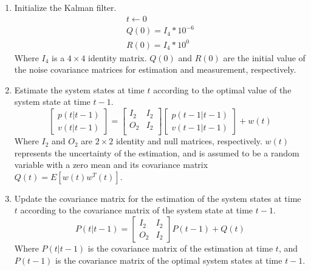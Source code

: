 \begin{enumerate}
	\item Initialize the Kalman filter.
	\begin{eqnarray*}
		t \leftarrow 0 \\
		Q(0) = I_4 * 10^{-6} \\
		R(0) = I_4 * 10^{0}
	\end{eqnarray*}
	Where \(I_4\) is a \(4 \times 4\) identity matrix. \(Q(0)\) and \(R(0)\) are the initial value of the noise covariance matrices for estimation and measurement, respectively. 
	\item Estimate the system states at time \(t\) according to the optimal value of the system state at time \(t-1\).
	\begin{equation}
		\left[
		\begin{matrix}
		p(t|t-1) \\
		v(t|t-1)
		\end{matrix}
		\right] =
		\begin{bmatrix}
		I_2&I_2\\
		O_2&I_2 \\
		\end{bmatrix}
		\begin{bmatrix}
		p(t-1|t-1) \\
		v(t-1|t-1)
		\end{bmatrix}
		+ w(t)
	\end{equation} 
	Where \(I_2\) and \(O_2\) are \(2 \times 2\) identity and null matrices, respectively. \(w(t)\) represents the uncertainty of the estimation, and is assumed to be a random variable with a zero mean and its covariance matrix \(Q(t) = E[w(t)w^T(t)]\).
	
	\item Update the covariance matrix for the estimation of the system states at time \(t\) according to the covariance matrix of the system state at time \(t-1\). 
	\begin{equation}
		P(t|t-1) = \begin{bmatrix}
		I_2&I_2 \\
		O_2&I_2
		\end{bmatrix} P(t-1) + Q(t)
	\end{equation}
	Where \(P(t|t-1)\) is the covariance matrix of the estimation at time \(t\), and \(P(t-1)\) is the covariance matrix of the optimal system states at time \(t-1\).
	

\end{enumerate}
